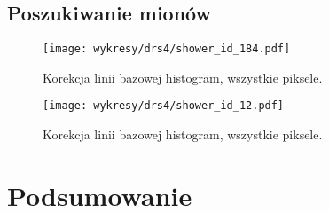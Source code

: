 \documentclass[a4paper,11pt,twoside]{article}
\begin{document}
\subsection{Poszukiwanie mionów}
\begin{figure}[H] 
\centering
\texttt{[image: wykresy/drs4/shower\_id\_184.pdf]}
\caption{Korekcja linii bazowej histogram, wszystkie piksele.}
\label{fig:muon_image}
\end{figure}

\begin{figure}[H] 
\centering
\texttt{[image: wykresy/drs4/shower\_id\_12.pdf]}
\caption{Korekcja linii bazowej histogram, wszystkie piksele.}
\label{fig:muon_image}
\end{figure}
\newpage
\section{Podsumowanie}
\end{document}
